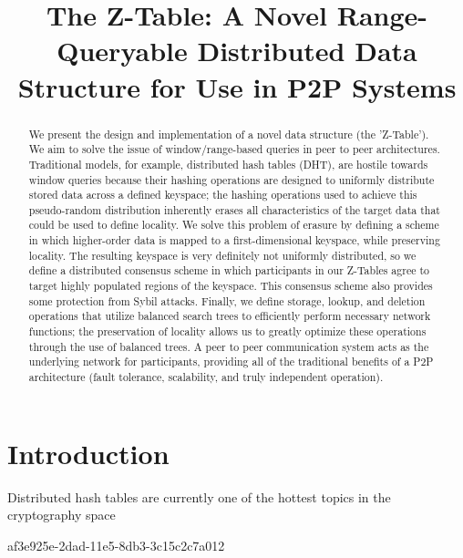 \documentclass[12pt]{article}
\title{The Z-Table: A Novel Range-Queryable Distributed Data Structure for Use in P2P Systems}
\begin{document}
\maketitle

\begin{abstract}
We present the design and implementation of a novel data structure (the 'Z-Table'). We aim to solve the issue of window/range-based queries in peer to peer architectures. Traditional models, for example,  distributed hash tables (DHT), are hostile towards window queries because their hashing operations are designed to uniformly distribute stored data across a defined keyspace; the hashing operations used to achieve this pseudo-random distribution inherently erases all characteristics of the target data that could be used to define locality. We solve this problem of erasure by defining a scheme in which higher-order data is mapped to a first-dimensional keyspace, while preserving locality. The resulting keyspace is very definitely not uniformly distributed, so we define a distributed consensus scheme in which participants in our Z-Tables agree to target highly populated regions of the keyspace. This consensus scheme also provides some protection from Sybil attacks. Finally, we define storage, lookup, and deletion operations that utilize balanced search trees to efficiently perform necessary network functions; the preservation of locality allows us to greatly optimize these operations through the use of balanced trees. A peer to peer communication system acts as the underlying network for participants, providing all of the traditional benefits of a P2P architecture (fault tolerance, scalability, and truly independent operation).
\end{abstract}


\newpage
\section{Introduction}
Distributed hash tables are currently one of the hottest topics in the cryptography space~\cite{Stoica:2001dj,Rowstron:2001ea,Ratnasamy:2001wn}

af3e925e-2dad-11e5-8db3-3c15c2c7a012\printbibliography
\end{document}
